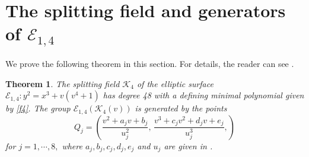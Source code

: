 \documentclass[11pt]{amsart}
\newcommand{\Q}{{\mathbb Q}}
\newcommand{\Ee}{{\mathcal E}}
\newcommand{\KK}{{\mathcal K}}
\newtheorem{thm}{Theorem}[section]
\numberwithin{equation}{section}
\numberwithin{table}{section}
\newcommand\<{\langle}
\begin{document}
\section{The splitting field and generators of $\Ee_{1, 4}$ }
\label{E8-(1,4)}

We prove the following theorem  in this section. For details, the reader can see  \cite[Check-4]{Shioda360-Codes}.
\begin{thm}
	\label{main3}
	The splitting field $\KK_4$ of the elliptic  surface  $\Ee_{1, 4}: y^2=x^3+   v (v^4+1)$ has degree 48  with a defining minimal polynomial given by \ref{f4}.
	The group  $\Ee_{1, 4}(\KK_4(v))$ is generated by the points
	$$Q_j=\left( \frac{ v^2 + a_j v +b_j}{u_j^2}, \, \frac{ v^3 +c_j v^2 + d_j v +e_j}{u_j^3},\right) $$ 
	for $j=1,\cdots, 8,$ 	where 
	$a_j, b_j, c_j, d_j, e_j$  and $u_j$ are given in
	\cite[Points-4]{Shioda360-Codes}.

\end{thm}
\end{document}
